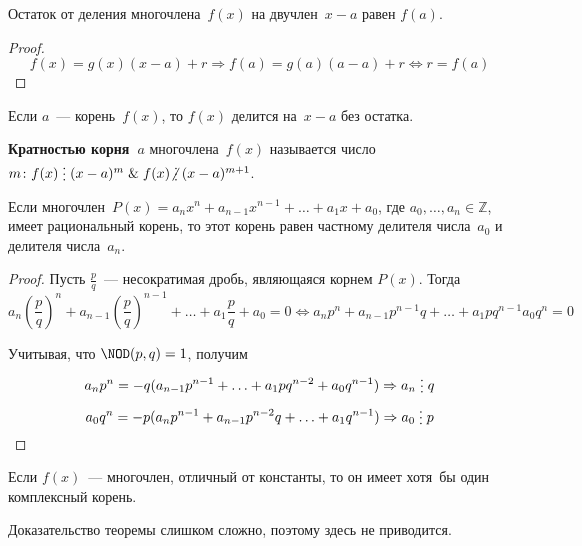 \begin{theorem}[Безу]
Остаток от деления многочлена~$f(x)$ на двучлен~$x - a$ равен $f(a)$.
\end{theorem}
\begin{proof}
\begin{equation*}
f(x) = g(x)(x - a) + r \Rightarrow f(a) = g(a)(a - a) + r \Leftrightarrow r = f(a)
\end{equation*}
\end{proof}

\begin{consequent}
\label{conseq:division_by_binomial}
Если $a$~--- корень~$f(x)$, то $f(x)$ делится на~$x - a$ без остатка.
\end{consequent}

\textbf{Кратностью корня~$a$} многочлена~$f(x)$ называется число~
$m \colon f(x) \mult (x - a)^m \lAnd f(x) \notmult (x - a)^{m+1}$.

\begin{theorem}
Если многочлен~$P(x) = a_n x^n + a_{n-1} x^{n-1} + \ldots + a_1 x + a_0$, где $a_0, \ldots, a_n \in \mathbb Z$, имеет рациональный корень, то этот корень равен частному делителя числа~$a_0$ и делителя числа~$a_n$.
\end{theorem}
\begin{proof}
Пусть $\frac{p}q$~--- несократимая дробь, являющаяся корнем $P(x)$.
Тогда
\begin{equation*}
a_n \left( \frac{p}q \right)^n + a_{n-1} \left( \frac{p}q \right)^{n-1} + \ldots + a_1 \frac{p}q + a_0 = 0 \Leftrightarrow
a_n p^n + a_{n-1} p^{n-1} q + \ldots + a_1 pq^{n-1} a_0 q^n = 0
\end{equation*}

Учитывая, что $\NOD(p, q) = 1$, получим
\begin{equation*}
a_n p^n = -q (a_{n-1} p^{n-1} + \ldots + a_1 pq^{n-2} + a_0 q^{n-1}) \Rightarrow
a_n \mult q
\end{equation*}
\begin{equation*}
a_0 q^n = -p (a_n p^{n-1} + a_{n-1} p^{n-2} q + \ldots + a_1 q^{n-1}) \Rightarrow
a_0 \mult p
\end{equation*}
\end{proof}

\begin{theorem}
\label{th:fundamental_th_of_algebra}
Если $f(x)$~--- многочлен, отличный от константы, то он имеет хотя~бы один комплексный корень.
\end{theorem}%
Доказательство теоремы слишком сложно, поэтому здесь не приводится.

